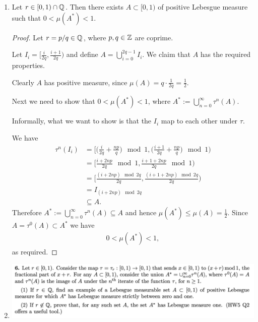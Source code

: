 \begin{enumerate}
\item
  \begin{claim*}
    Let $r \in [0, 1) \cap \mathbb{Q}$. Then there exists $A \subset [0, 1)$ of positive Lebesgue measure such that $0 < \mu(A^*) < 1$.
  \end{claim*}
  \begin{proof}
    Let $r = p/q \in \mathbb{Q}$, where $p, q \in \mathbb{Z}$ are coprime.

    Let $I_i = [\frac{i}{2q}, \frac{i+1}{2q})$ and define $A = \bigcup_{i=0}^{2q-1} I_i$. We claim that $A$ has
    the required properties.

    Clearly $A$ has positive measure, since $\mu(A) = q \cdot \frac{1}{2q} = \frac{1}{2}$.

    Next we need to show that $0 < \mu(A^*) < 1$, where $A^* := \bigcup_{n=0}^\infty \tau^n(A)$.

    Informally, what we want to show is that the $I_i$ map to each other under $\tau$.

    We have
    \begin{align*}
      \tau^n(I_i)
      &= \Big[\big(\frac{i}{2q} + \frac{np}{q}\big) \mod 1, \big(\frac{i+1}{2q} + \frac{np}{q}\big) \mod 1 \Big) \\
      &= \Big[\frac{i + 2np}{2q} \mod 1, \frac{i + 1 + 2np}{2q} \mod 1\Big) \\
      &= \Big[\frac{(i + 2np) \mod 2q}{2q}, \frac{(i + 1 + 2np) \mod 2q}{2q}\Big) \\
      &= I_{(i + 2np) \mod 2q} \\
      &\subseteq A.
    \end{align*}
    Therefore $A^* := \bigcup_{n=0}^\infty \tau^n(A) \subseteq A$ and
    hence $\mu(A^*) \leq \mu(A) = \frac{1}{2}$. Since $A = \tau^0(A) \subset A^*$ we have
    \begin{align*}
      0 < \mu(A^*) < 1,
    \end{align*}
    as required.
  \end{proof}

\item

\begin{mdframed}
  \includegraphics[width=400pt]{img/analysis--berkeley-202a-hw06-9bc5.png}
\end{mdframed}


\end{enumerate}
